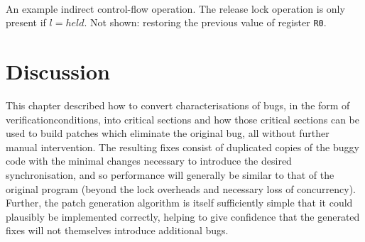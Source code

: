 \begin{sanefig}
{{
    }\\
    \hspace{\textwidth}
  }
  \caption{An example indirect control-flow operation.  The release
    lock operation is only present if $l=\mathit{held}$.  Not shown: restoring
    the previous value of register {\tt R0}.}
  \label{fig:fix:eg_indirect}
\end{sanefig}

\section{Discussion}

This chapter described how to convert characterisations of bugs, in
the form of \glspl{verificationcondition}, into critical sections and
how those critical sections can be used to build patches which
eliminate the original bug, all without further manual intervention.
The resulting fixes consist of duplicated copies of the buggy code
with the minimal changes necessary to introduce the desired
synchronisation, and so performance will generally be similar to that
of the original program (beyond the lock overheads and necessary loss
of concurrency).  Further, the patch generation algorithm is itself
sufficiently simple that it could plausibly be implemented correctly,
helping to give confidence that the generated fixes will not
themselves introduce additional bugs.

